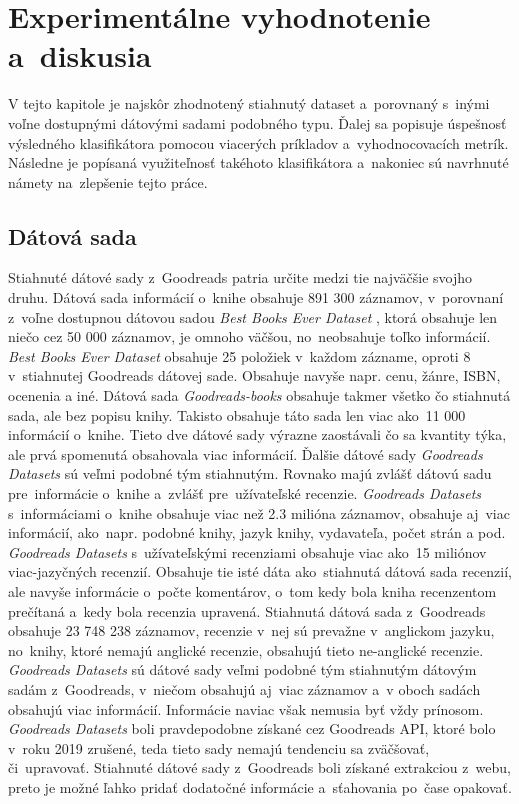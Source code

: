 \chapter{Experimentálne vyhodnotenie a~diskusia}
\label{experimenty}
V tejto kapitole je najskôr zhodnotený stiahnutý dataset a~porovnaný s~inými voľne dostupnými dátovými sadami podobného typu. Ďalej sa popisuje úspešnosť výsledného klasifikátora pomocou viacerých príkladov a~vyhodnocovacích metrík. Následne je popísaná využiteľnosť takéhoto klasifikátora a~nakoniec sú navrhnuté námety na~zlepšenie tejto práce. 

\section{Dátová sada}
Stiahnuté dátové sady z~Goodreads patria určite medzi tie najväčšie svojho druhu. Dátová sada informácií o~knihe obsahuje 891 300 záznamov, v~porovnaní z~voľne dostupnou dátovou sadou \textit{Best Books Ever Dataset} \cite{Lozano:2020}, ktorá obsahuje len niečo cez 50 000 záznamov, je omnoho väčšou, no~neobsahuje toľko informácií. \textit{Best Books Ever Dataset} obsahuje 25 položiek v~každom zázname, oproti 8 v~stiahnutej Goodreads dátovej sade. Obsahuje navyše napr. cenu, žánre, ISBN, ocenenia a iné. Dátová sada \textit{Goodreads-books} \cite{Dasgupta:2020} obsahuje takmer všetko čo stiahnutá sada, ale bez popisu knihy. Takisto obsahuje táto sada len viac ako~11 000 informácií o~knihe. Tieto dve dátové sady výrazne zaostávali čo sa kvantity týka, ale prvá spomenutá obsahovala viac informácií. Ďalšie dátové sady \textit{Goodreads Datasets} \cite{Wan:2019} \cite{Wan:2018} sú veľmi podobné tým stiahnutým. Rovnako majú zvlášť dátovú sadu pre~informácie o~knihe a~zvlášť pre~užívateľské recenzie. \textit{Goodreads Datasets} s~informáciami o~knihe obsahuje viac než 2.3 milióna záznamov, obsahuje aj~viac informácií, ako~napr. podobné knihy, jazyk knihy, vydavateľa, počet strán a pod. \textit{Goodreads Datasets} s~užívateľskými recenziami obsahuje viac ako~15 miliónov viac-jazyčných recenzií. Obsahuje tie isté dáta ako~stiahnutá dátová sada recenzií, ale navyše informácie o~počte komentárov, o~tom kedy bola kniha recenzentom prečítaná a~kedy bola recenzia upravená. Stiahnutá dátová sada z~Goodreads obsahuje 23 748 238 záznamov, recenzie v~nej sú prevažne v~anglickom jazyku, no~knihy, ktoré nemajú anglické recenzie, obsahujú tieto ne-anglické recenzie. \textit{Goodreads Datasets} sú dátové sady veľmi podobné tým stiahnutým dátovým sadám z~Goodreads, v~niečom obsahujú aj~viac záznamov a~v oboch sadách obsahujú viac informácií. Informácie naviac však nemusia byť vždy prínosom. \textit{Goodreads Datasets} boli pravdepodobne získané cez Goodreads API, ktoré bolo v~roku 2019 zrušené, teda tieto sady nemajú tendenciu sa zväčšovať, či~upravovať. Stiahnuté dátové sady z~Goodreads boli získané extrakciou z~webu, preto je možné ľahko pridať dodatočné informácie a~sťahovania po~čase opakovať.

